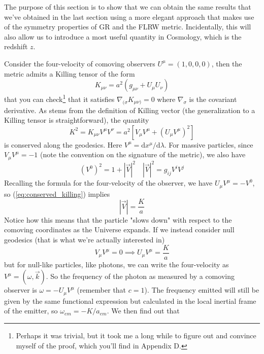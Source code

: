 \par The purpose of this section is to show that we can obtain the same results that we've obtained in the last section using a more elegant approach that makes use of the symmetry properties of GR and the FLRW metric. Incidentally, this will also allow us to introduce a most useful quantity in Cosmology, which is the redshift $z$.
\par Consider the four-velocity of comoving observers $U^{\mu} = (1,0,0,0)$, then the metric admits a Killing tensor of the form 
\begin{equation}
    K_{\mu\nu} = a^{2}(g_{\mu\nu}+U_{\mu}U_{\nu})
    \label{eq:killingtensor}
\end{equation}
that you can check\footnote{Perhaps it was trivial, but it took me a long while to figure out and convince myself of the proof, which you'll find in Appendix D.} that it satisfies $\nabla_{(\sigma}K_{\mu\nu)} = 0$ where $\nabla_{\sigma}$ is the covariant derivative. As stems from the definition of Killing vector (the generalization to a Killing tensor is straightforward), the quantity 
\begin{equation}
    K^{2} = K_{\mu\nu}V^{\mu}V^{\nu} = a^{2}\left[V_{\mu}V^{\mu}+(U_{\mu}V^{\mu})^{2}\right]
    \label{eq:conserved_killing}
\end{equation}
is conserved along the geodesics. Here $V^{\mu} = \text{d}x^{\mu}/\text{d}\lambda$. For massive particles, since $V_{\mu}V^{\mu} = -1$ (note the convention on the signature of the metric), we also have
\begin{equation*}
    (V^{0})^{2} = 1+|\vec{V}|^{2} \quad |\vec{V}|^{2} = g_{ij}V^{i}V^{j}
\end{equation*}
Recalling the formula for the four-velocity of the observer, we have $U_{\mu}V^{\mu} = -V^{0}$, so (\ref{eq:conserved_killing}) implies
\begin{equation*}
    |\vec{V}| = \frac{K}{a}
\end{equation*}
Notice how this means that the particle "slows down" with respect to the comoving coordinates as the Universe expands. If we instead consider null geodesics (that is what we're actually interested in)
\begin{equation*}
    V_{\mu}V^{\mu} = 0 \implies U_{\mu}V^{\mu} = \frac{K}{a}
\end{equation*}
but for null-like particles, like photons, we can write the four-velocity as $V^{\mu} = (\omega, \vec{k})$. So the frequency of the photon as measured by a comoving observer is $\omega = -U_{\mu}V^{\mu}$ (remember that $c=1$). The frequency emitted will still be given by the same functional expression but calculated in the local inertial frame of the emitter, so $\omega_{em} = -K/a_{em}$. We then find out that 
